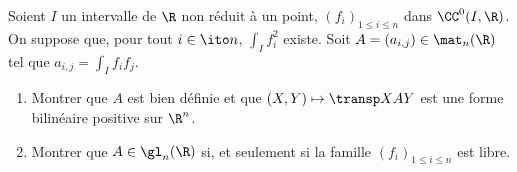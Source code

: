 \begin{enonce}
\begin{exercise}[ID={RMS124 E655 Mines-Ponts PSI},subtitle={},tags={}, difficulty={0}]
Soient $I$ un intervalle de $\R$ non réduit à un point, $(f_i)_{1\leq i\leq n}$ dans $\CC^0(I,\R)$.
On suppose que, pour tout $i\in\ito n$, $\int_I f_i^2$ existe.
Soit $A=(a_{i,j})\in\mat_n(\R)$ tel que $a_{i,j}=\int_I f_if_j$.
\begin{enumerate}
  \item Montrer que $A$ est bien définie et que $(X,Y)\mapsto \transp X A Y$ est une forme bilinéaire positive sur $\R^n$.
  \item Montrer que $A\in\gl_n(\R)$ si, et seulement si la famille $(f_i)_{1\leq i\leq n}$ est libre.
\end{enumerate}
\end{exercise}
\begin{solution}
\end{solution}
\end{enonce}
